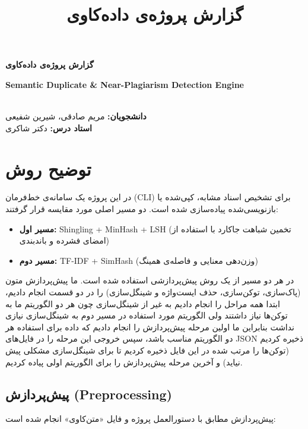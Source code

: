 \documentclass[12pt,a4paper]{article}
\title{گزارش پروژه‌ی داده‌کاوی}
\author{}
\date{}
\begin{document}
\begin{center}
    {\Large \textbf{گزارش پروژه‌ی داده‌کاوی}}\\[6pt]
    \begin{latin}
        {\large \textbf{Semantic Duplicate \& Near-Plagiarism Detection Engine}}
    \end{latin}\\[10pt]
    \textbf{دانشجویان:} مریم صادقی، شیرین شفیعی \\
    \textbf{استاد درس:} دکتر شاکری
\end{center}

\noindent\hrulefill

\section{توضیح روش}

در این پروژه یک سامانه‌ی خط‌فرمان (CLI) برای تشخیص اسناد مشابه، کپی‌شده یا بازنویسی‌شده پیاده‌سازی شده است. دو مسیر اصلی مورد مقایسه قرار گرفتند:

\begin{itemize}
    \item \textbf{مسیر اول:} Shingling + MinHash + LSH (تخمین شباهت جاکارد با استفاده از امضای فشرده و باندبندی)
    \item \textbf{مسیر دوم:} TF-IDF + SimHash (وزن‌دهی معنایی و فاصله‌ی همینگ)
\end{itemize}

در هر دو مسیر از یک روش پیش‌پردازشی استفاده شده است. ما پیش‌پردازش متون (پاک‌سازی، توکن‌سازی، حذف ایست‌واژه و شینگل‌سازی) را در دو قسمت انجام دادیم، ابتدا همه مراحل را انجام دادیم به غیر از شینگل‌سازی چون هر دو الگوریتم ما به توکن‌ها نیاز داشتند ولی الگوریتم مورد استفاده در مسیر دوم به شینگل‌سازی نیازی نداشت بنابراین ما اولین مرحله پیش‌پردازش را انجام دادیم که داده برای استفاده هر دو الگوریتم مناسب باشد، سپس خروجی این مرحله را در فایل‌های JSON ذخیره کردیم (توکن‌ها را مرتب شده در این فایل ذخیره کردیم تا برای شینگل‌سازی مشکلی پیش نیاید) و آخرین مرحله پیش‌پردازش را برای الگوریتم اولی پیاده کردیم.

\subsection{پیش‌پردازش (Preprocessing)}

پیش‌پردازش مطابق با دستورالعمل پروژه و فایل «متن‌کاوی» انجام شده است:
\end{document}
